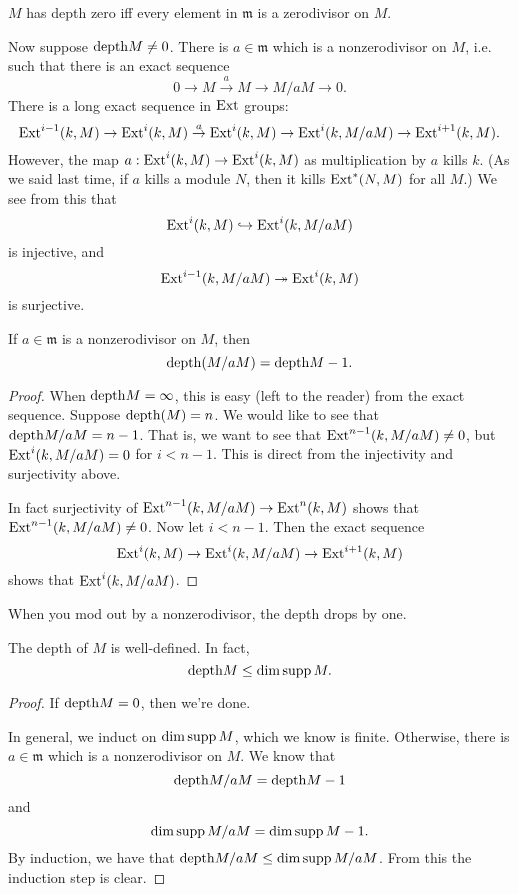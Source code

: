 \begin{proposition} 
$M$ has depth zero iff every element in $\mathfrak{m}$ is a
zerodivisor on $M$.
\end{proposition} 

Now suppose $\mathrm{depth} M \neq 0$. There is $a \in \mathfrak{m}$
which is a
nonzerodivisor on $M$, i.e.  such that there is
an exact sequence
\[ 0 \to M \stackrel{a}{\to} M \to M/aM \to 0.  \]
There is a long exact sequence in $\mathrm{Ext}$ groups:
\[\mathrm{Ext}^{i-1}(k,M) \to \mathrm{Ext}^i(k,M) \stackrel{a}{\to} \mathrm{Ext}^i(k,M)
\to \mathrm{Ext}^i(k,
M/aM) \to \mathrm{Ext}^{i+1}(k,M)  .\]
However, the map $a: \mathrm{Ext}^i(k,M) \to \mathrm{Ext}^i(k,M)$ as
multiplication by $a$
kills $k$. (As we said last time, if $a$ kills a module $N$,
then it kills
$\mathrm{Ext}^*(N,M)$ for all $M$.) We see from this that
\[ \mathrm{Ext}^i(k,M) \hookrightarrow \mathrm{Ext}^i(k,M/aM)  \]
is injective, and 
\[ \mathrm{Ext}^{i-1}(k, M/aM) \twoheadrightarrow \mathrm{Ext}^i(k,M)  \]
is surjective.

\begin{corollary} 
If $a \in \mathfrak{m}$ is a nonzerodivisor on $M$, then 
\[ \mathrm{depth}(M/aM) = \mathrm{depth} M -1.  \]
\end{corollary} 
\begin{proof} 
When $\mathrm{depth} M = \infty$, this is easy (left to the reader) from
the exact
sequence. Suppose $\mathrm{depth}(M) = n$. We would like to see that
$\mathrm{depth} M/aM =
n-1$. That is, we want to see that $\mathrm{Ext}^{n-1}(k,M/aM) \neq 0$,
but
$\mathrm{Ext}^i(k,M/aM) =
0$ for $i < n-1$. This is direct from the injectivity and
surjectivity above.

In fact surjectivity of $\mathrm{Ext}^{n-1}(k,M/aM) \to \mathrm{Ext}^n(k,M)$
shows that
$\mathrm{Ext}^{n-1}(k,M/aM) \neq 0$. Now let $i < n-1$. Then the exact
sequence
\[ \mathrm{Ext}^i(k,M) \to \mathrm{Ext}^i(k,M/aM) \to \mathrm{Ext}^{i+1}(k,M)  \]
shows that $\mathrm{Ext}^i(k, M/aM)$.
\end{proof} 

When you mod out by a nonzerodivisor, the depth drops by one.

\begin{corollary} 
The depth of $M$ is well-defined. In fact, 
\[ \mathrm{depth} M \leq \dim \operatorname{supp} M.  \]
\end{corollary} 
\begin{proof} 
If $\mathrm{depth} M = 0$, then we're done.

In general, we induct on $\dim \operatorname{supp} M$, which we know is
finite. Otherwise,
there is $ a \in \mathfrak{m}$ which is a nonzerodivisor on $M$.
We know that
\[ \mathrm{depth} M/aM = \mathrm{depth} M -1  \]
and
\[ \dim \operatorname{supp} M/aM = \dim \operatorname{supp} M -1.  \]
By induction, we have that $\mathrm{depth} M/aM \leq \dim \operatorname{supp} M/aM$.
From this the
induction step is clear.
\end{proof} 

